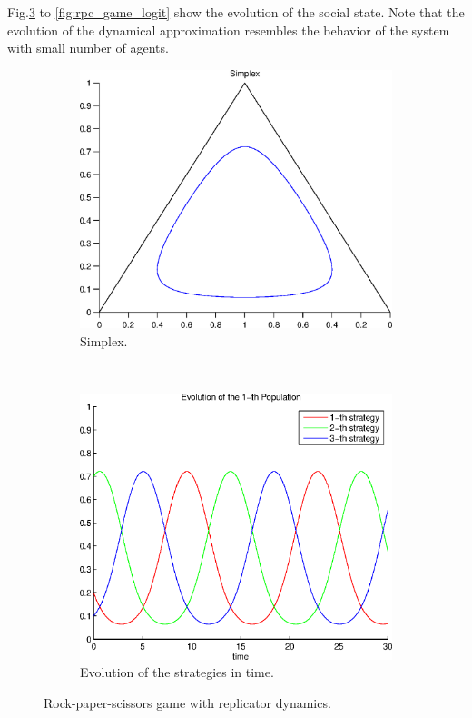 \documentclass[a4paper,10pt]{article}
\begin{document}
Fig.\ref{fig:rpc_game_rd} to \ref{fig:rpc_game_logit} show the evolution of the social state. Note that the evolution of the dynamical approximation resembles the behavior of the system with small number of agents.


\begin{figure}
  \centering
  \begin{subfigure}[b]{0.45\textwidth}
	  \includegraphics[width=\textwidth]{./images/test1_simplex_rd.eps}
	  \caption{Simplex.}
	  \label{fig:test1_simplex_rd}
  \end{subfigure}
  ~ 
  \begin{subfigure}[b]{0.45\textwidth}
	  \includegraphics[width=\textwidth]{./images/test1_ev_rd.eps}
	  \caption{Evolution of the strategies in time.}
	  \label{fig:test1_ev_rd}
  \end{subfigure}
  \caption{Rock-paper-scissors game with replicator dynamics.}
  \label{fig:rpc_game_rd}
\end{figure}
\end{document}
